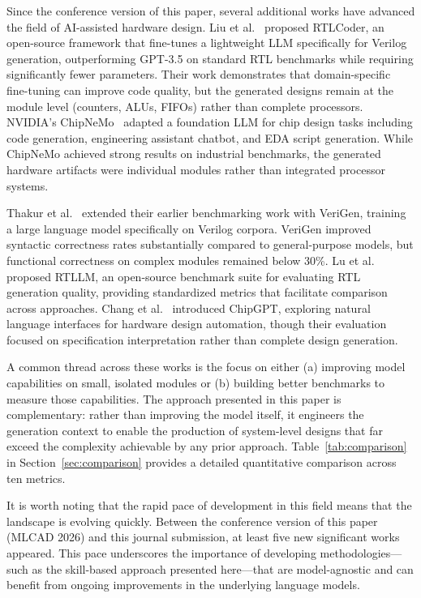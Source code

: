 \documentclass[journal]{IEEEtran}
\begin{document}
Since the conference version of this paper, several additional works have
advanced the field of AI-assisted hardware design.  Liu et
al.~\cite{liu2024rtlcoder} proposed RTLCoder, an open-source framework
that fine-tunes a lightweight LLM specifically for Verilog generation,
outperforming GPT-3.5 on standard RTL benchmarks while requiring
significantly fewer parameters.  Their work demonstrates that
domain-specific fine-tuning can improve code quality, but the generated
designs remain at the module level (counters, ALUs, FIFOs) rather than
complete processors.  NVIDIA's ChipNeMo~\cite{chipnemo2024} adapted a
foundation LLM for chip design tasks including code generation,
engineering assistant chatbot, and EDA script generation.  While
ChipNeMo achieved strong results on industrial benchmarks, the
generated hardware artifacts were individual modules rather than
integrated processor systems.

Thakur et al.~\cite{thakur2024verigen} extended their earlier
benchmarking work with VeriGen, training a large language model
specifically on Verilog corpora.  VeriGen improved syntactic correctness
rates substantially compared to general-purpose models, but functional
correctness on complex modules remained below 30\%.  Lu et
al.~\cite{lu2024rtllm} proposed RTLLM, an open-source benchmark suite
for evaluating RTL generation quality, providing standardized metrics
that facilitate comparison across approaches.  Chang et
al.~\cite{chang2024chipassist} introduced ChipGPT, exploring natural
language interfaces for hardware design automation, though their
evaluation focused on specification interpretation rather than complete
design generation.

A common thread across these works is the focus on either (a) improving
model capabilities on small, isolated modules or (b) building better
benchmarks to measure those capabilities.  The approach presented in this
paper is complementary: rather than improving the model itself, it
engineers the generation context to enable the production of
system-level designs that far exceed the complexity achievable by any
prior approach.  Table~\ref{tab:comparison} in Section~\ref{sec:comparison}
provides a detailed quantitative comparison across ten metrics.

It is worth noting that the rapid pace of development in this field
means that the landscape is evolving quickly.  Between the conference
version of this paper (MLCAD 2026) and this journal submission, at least
five new significant works appeared.  This pace underscores the
importance of developing methodologies---such as the skill-based approach
presented here---that are model-agnostic and can benefit from ongoing
improvements in the underlying language models.
\end{document}
